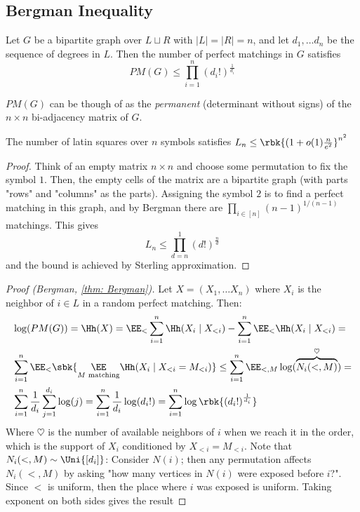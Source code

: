 \documentclass[a4paper, 11pt, oneside]{book}
\begin{document}
	\subsection{Bergman Inequality}
	\begin{thm}
		\label{thm: Bergman} Let $G$ be a bipartite graph over $L\sqcup R$ with $|L| = |R| = n$, and let $d_1,\ldots d_n$ be the sequence of degrees in $L$. Then the number of perfect matchings in $G$ satisfies
		\[
		PM(G)\le \prod_{i=1}^n(d_i!)^\frac{1}{d_i}
		\]
	\end{thm}
	\begin{remark}
		$PM(G)$ can be though of as the \emph{permanent} (determinant without signs) of the $n\times n$ bi-adjacency matrix of $G$.
	\end{remark}
	\begin{cor}
		The number of latin squares over $n$ symbols satisfies $L_n \le \rbk{(1+o(1)\frac{n}{e^2}}^{n^2}$
	\end{cor}
	\begin{proof}
		Think of an empty matrix $n\times n$ and choose some permutation to fix the symbol $1$. Then, the empty cells of the matrix are a bipartite graph (with parts "rows" and "columns" as the parts). Assigning the symbol $2$ is to find a perfect matching in this graph, and by Bergman there are $\prod_{i\in [n]}(n-1)^{1/(n-1)}$ matchings. This gives 
		\[
		L_n\le \prod_{d = n}^1(d!)^{\frac{n}{d}}
		\]
		and the bound is achieved by Sterling approximation.
	\end{proof}
	
	\begin{proof}
		[Proof (Bergman, \ref{thm: Bergman})] Let $X = (X_1,\ldots X_n)$ where $X_i$ is the neighbor of $i\in L$ in a random perfect matching. Then:
		\begin{align*}
			&\log(PM(G))=\Hh(X) = \EE_{<}\sum_{i=1}^n \Hh(X_i\mid X_{<i}) - \sum_{i=1}^n \EE_{<}\Hh(X_i\mid X_{<i}) = \\
			&\sum_{i=1}^n \EE_{<}\sbk{\underset{M\text{ matching}}{\EE}\Hh(X_i\mid X_{<i} = M_{<i})} \le \sum_{i=1}^n \EE_{<,M}\log(\overbrace{N_i(<,M)}^\heartsuit)  = \\
			&\sum_{i=1}^n \frac{1}{d_i}\sum_{j=1}^{d_i}\log(j)  = \sum_{i=1}^n \frac{1}{d_i}\log(d_i!) = \sum_{i=1}^n \log\rbk{(d_i!)^{\frac{1}{d_i}}}
		\end{align*}
		Where $\heartsuit$ is the number of available neighbors of $i$ when we reach it in the order, which is the support of $X_i$ conditioned by $X_{<i} = M_{<i}$. Note that $N_i(<,M)\sim \Uni{[d_i]}$: Consider $N(i)$; then any permutation affects $N_i(<,M)$ by asking "how many vertices in $N(i)$ were exposed before $i$?". Since $<$ is uniform, then the place where $i$ was exposed is uniform. Taking exponent on both sides gives the result
	\end{proof}
\end{document}
